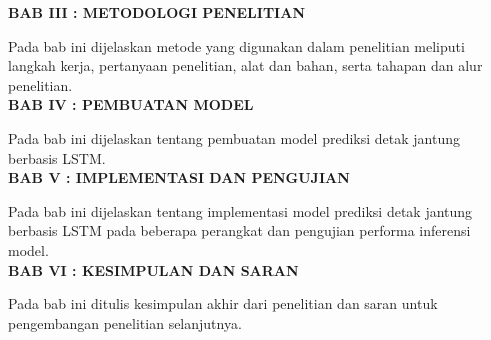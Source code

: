 \noindent
\textbf{BAB III : METODOLOGI PENELITIAN}

Pada bab ini dijelaskan metode yang digunakan dalam penelitian
meliputi langkah kerja, pertanyaan penelitian, alat dan bahan, serta
tahapan dan alur penelitian.\\

%

\noindent
\textbf{BAB IV : PEMBUATAN MODEL}

Pada bab ini dijelaskan tentang pembuatan model prediksi detak jantung berbasis LSTM.\\

\noindent
\textbf{BAB V : IMPLEMENTASI DAN PENGUJIAN}

Pada bab ini dijelaskan tentang implementasi model prediksi detak jantung berbasis LSTM pada beberapa perangkat dan pengujian performa inferensi model.\\

\noindent
\textbf{BAB VI : KESIMPULAN DAN SARAN}

Pada bab ini ditulis kesimpulan akhir dari penelitian dan saran untuk
pengembangan penelitian selanjutnya.\\
